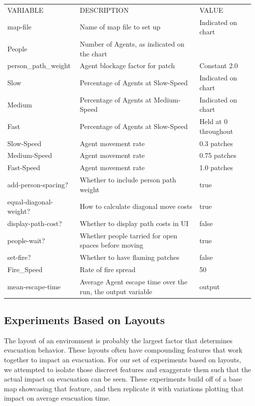 \documentclass[12pt,letterpaper]{article}
\begin{document}
\begin{tabular}{ l | l | l }
VARIABLE & DESCRIPTION & VALUE \\
map-file & Name of map file to set up & Indicated on chart \\
People & Number of Agents, as indicated on the chart \\
person\_path\_weight & Agent blockage factor for patch & Constant 2.0 \\
Slow & Percentage of Agents at Slow-Speed & Indicated on chart \\
Medium & Percentage of Agents at Medium-Speed & Indicated on chart \\
Fast & Percentage of Agents at Slow-Speed & Held at 0 throughout \\
Slow-Speed & Agent movement rate & 0.3 patches \\
Medium-Speed & Agent movement rate  & 0.75 patches \\
Fast-Speed & Agent movement rate  & 1.0 patches \\
add-person-spacing? & Whether to include person path weight & true \\
equal-diagonal-weight? & How to calculate diagonal move costs & true \\
display-path-cost? & Whether to display path costs in UI & false \\
people-wait? & Whether people tarried for open spaces before moving & true \\
set-fire? & Whether to have flaming patches & false \\
Fire\_Speed & Rate of fire spread & 50 \\
mean-escape-time & Average Agent escape time over the run, the output variable & output \\
\end{tabular}

\subsection{Experiments Based on Layouts} \label{expLayout}

The layout of an environment is probably the largest factor that determines evacuation behavior.  These layouts often have compounding features that work together to impact an evacuation\cite{abmEvac}. For our set of experiments based on layouts, we attempted to isolate those discreet features and exaggerate them such that the actual impact on evacuation can be seen.  These experiments build off of a base map showcasing that feature, and then replicate it with variations plotting that impact on average evacuation time.
\end{document}
